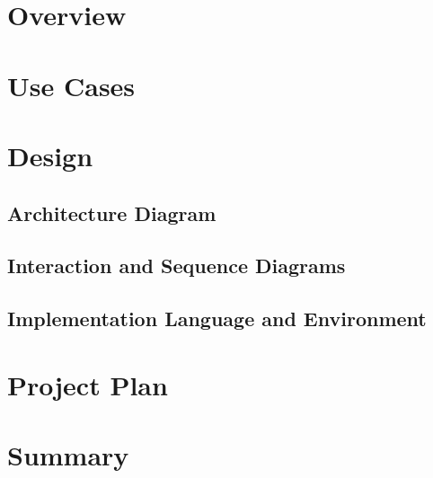 \documentclass{article}
\begin{document}
\maketitle

\section{Overview}

\section{Use Cases}

\section{Design}
\subsection{Architecture Diagram}

\subsection{Interaction and Sequence Diagrams}

\subsection{Implementation Language and Environment}


\section{Project Plan}

\section{Summary}
\end{document}
